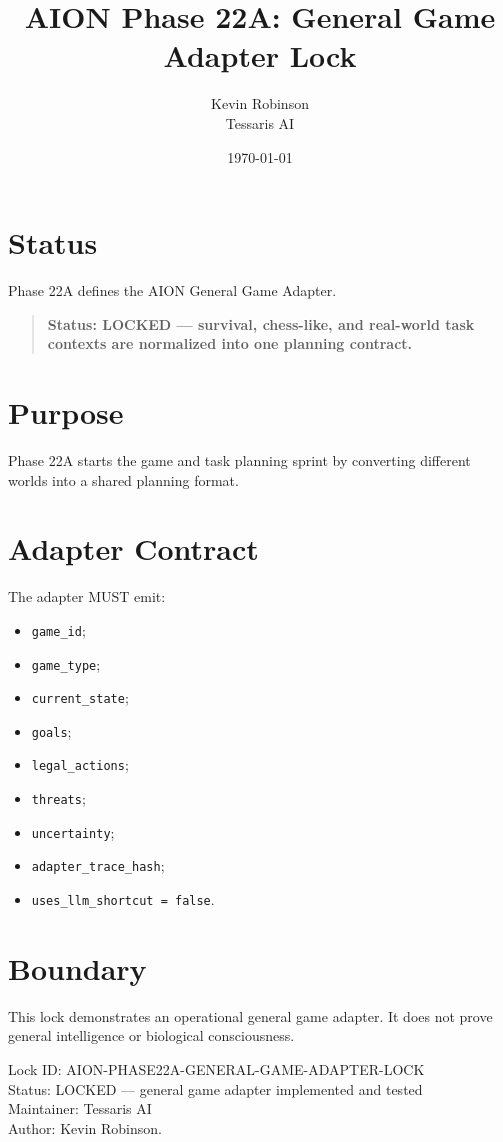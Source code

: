 \documentclass[11pt,a4paper]{article}
\title{\textbf{AION Phase 22A: General Game Adapter Lock}}
\author{Kevin Robinson\\Tessaris AI}
\date{\today}
\begin{document}
\maketitle

\section{Status}

Phase 22A defines the AION General Game Adapter.

\begin{quote}
\textbf{Status: LOCKED --- survival, chess-like, and real-world task contexts are normalized into one planning contract.}
\end{quote}

\section{Purpose}

Phase 22A starts the game and task planning sprint by converting different worlds into a shared planning format.

\section{Adapter Contract}

The adapter MUST emit:

\begin{itemize}
  \item \texttt{game\_id};
  \item \texttt{game\_type};
  \item \texttt{current\_state};
  \item \texttt{goals};
  \item \texttt{legal\_actions};
  \item \texttt{threats};
  \item \texttt{uncertainty};
  \item \texttt{adapter\_trace\_hash};
  \item \texttt{uses\_llm\_shortcut = false}.
\end{itemize}

\section{Boundary}

This lock demonstrates an operational general game adapter. It does not prove general intelligence or biological consciousness.

\bigskip

\noindent
Lock ID: AION-PHASE22A-GENERAL-GAME-ADAPTER-LOCK\\
Status: LOCKED --- general game adapter implemented and tested\\
Maintainer: Tessaris AI\\
Author: Kevin Robinson.
\end{document}
